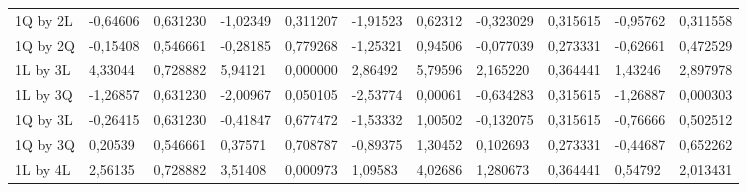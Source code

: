 \begin{table}[H]
{\begin{tabular}{lllllllllll}
\rowcolor[HTML]{FFFFFF} 
1Q by 2L       & {\color[HTML]{333333} -0,64606} & {\color[HTML]{333333} 0,631230} & {\color[HTML]{333333} -1,02349} & {\color[HTML]{333333} 0,311207} & {\color[HTML]{333333} -1,91523} & {\color[HTML]{333333} 0,62312}  & {\color[HTML]{333333} -0,323029} & {\color[HTML]{333333} 0,315615} & {\color[HTML]{333333} -0,95762} & {\color[HTML]{333333} 0,311558}  \\
\rowcolor[HTML]{FFFFFF} 
1Q by 2Q       & {\color[HTML]{333333} -0,15408} & {\color[HTML]{333333} 0,546661} & {\color[HTML]{333333} -0,28185} & {\color[HTML]{333333} 0,779268} & {\color[HTML]{333333} -1,25321} & {\color[HTML]{333333} 0,94506}  & {\color[HTML]{333333} -0,077039} & {\color[HTML]{333333} 0,273331} & {\color[HTML]{333333} -0,62661} & {\color[HTML]{333333} 0,472529}  \\
\rowcolor[HTML]{FFFFFF} 
1L by 3L       & {\color[HTML]{FF0000} 4,33044}  & {\color[HTML]{FF0000} 0,728882} & {\color[HTML]{FF0000} 5,94121}  & {\color[HTML]{FF0000} 0,000000} & {\color[HTML]{FF0000} 2,86492}  & {\color[HTML]{FF0000} 5,79596}  & {\color[HTML]{FF0000} 2,165220}  & {\color[HTML]{FF0000} 0,364441} & {\color[HTML]{FF0000} 1,43246}  & {\color[HTML]{FF0000} 2,897978}  \\
\rowcolor[HTML]{FFFFFF} 
1L by 3Q       & {\color[HTML]{333333} -1,26857} & {\color[HTML]{333333} 0,631230} & {\color[HTML]{333333} -2,00967} & {\color[HTML]{333333} 0,050105} & {\color[HTML]{333333} -2,53774} & {\color[HTML]{333333} 0,00061}  & {\color[HTML]{333333} -0,634283} & {\color[HTML]{333333} 0,315615} & {\color[HTML]{333333} -1,26887} & {\color[HTML]{333333} 0,000303}  \\
\rowcolor[HTML]{FFFFFF} 
1Q by 3L       & {\color[HTML]{333333} -0,26415} & {\color[HTML]{333333} 0,631230} & {\color[HTML]{333333} -0,41847} & {\color[HTML]{333333} 0,677472} & {\color[HTML]{333333} -1,53332} & {\color[HTML]{333333} 1,00502}  & {\color[HTML]{333333} -0,132075} & {\color[HTML]{333333} 0,315615} & {\color[HTML]{333333} -0,76666} & {\color[HTML]{333333} 0,502512}  \\
\rowcolor[HTML]{FFFFFF} 
1Q by 3Q       & {\color[HTML]{333333} 0,20539}  & {\color[HTML]{333333} 0,546661} & {\color[HTML]{333333} 0,37571}  & {\color[HTML]{333333} 0,708787} & {\color[HTML]{333333} -0,89375} & {\color[HTML]{333333} 1,30452}  & {\color[HTML]{333333} 0,102693}  & {\color[HTML]{333333} 0,273331} & {\color[HTML]{333333} -0,44687} & {\color[HTML]{333333} 0,652262}  \\
\rowcolor[HTML]{FFFFFF} 
1L by 4L       & {\color[HTML]{FF0000} 2,56135}  & {\color[HTML]{FF0000} 0,728882} & {\color[HTML]{FF0000} 3,51408}  & {\color[HTML]{FF0000} 0,000973} & {\color[HTML]{FF0000} 1,09583}  & {\color[HTML]{FF0000} 4,02686}  & {\color[HTML]{FF0000} 1,280673}  & {\color[HTML]{FF0000} 0,364441} & {\color[HTML]{FF0000} 0,54792}  & {\color[HTML]{FF0000} 2,013431}  \\

\end{tabular}}
\end{table}
